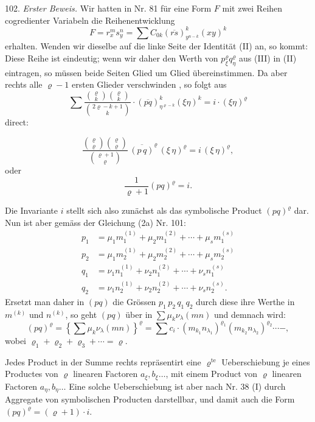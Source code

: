 102. \textit{Erster Beweis.} Wir hatten in Nr. 81 für eine Form $F$ mit
zwei Reihen cogredienter Variabeln die Reihenentwicklung
\[
F = r_x^m s_y^n = \sum C_{0k}(\overline{rs})^k_{y^{n-k}}(xy)^k
\]
erhalten. Wenden wir dieselbe auf die linke Seite der Identität (II)
an, so kommt:
Diese Reihe ist eindeutig; wenn wir daher den Werth von $p^\varrho_\xi q^\varrho_\eta$
aus (III) in (II) eintragen, so müssen beide Seiten Glied um Glied
übereinstimmen. Da aber rechts alle $\varrho-1$ ersten Glieder verschwinden
, so folgt aus
\[
\sum \frac{\binom{\varrho}{k}\binom{\varrho}{k}}{\binom{2\varrho-k+1}{k}}\cdot(\overline{pq})^k_{\eta^{\varrho-k}}(\xi\eta)^k = i\cdot(\xi\eta)^\varrho
\]
direct:


\[
\frac{\binom{\varrho}{\varrho}\binom{\varrho}{\varrho}}{\binom{\varrho+1}{\varrho}}\,\overline{(p\,q)}^\varrho\,(\xi\,\eta)^\varrho = i\,(\xi\,\eta)^\varrho,
\]
oder
\[
\frac{1}{\varrho+1}(pq)^\varrho = i.
\]

Die Invariante $i$ stellt sich also zunächst als das symbolische Product $(pq)^\varrho$ dar. Nun ist aber gemäss der Gleichung (2a) Nr. 101:
\[
\begin{aligned}
p_1 &= \mu_1 m_1^{(1)} + \mu_2 m_1^{(2)} + \cdots + \mu_s m_1^{(s)}\\
p_2 &= \mu_1 m_2^{(1)} + \mu_2 m_2^{(2)} + \cdots + \mu_s m_2^{(s)}\\
q_1 &= \nu_1 n_1^{(1)} + \nu_2 n_1^{(2)} + \cdots + \nu_s n_1^{(s)}\\
q_2 &= \nu_1 n_2^{(1)} + \nu_2 n_2^{(2)} + \cdots + \nu_s n_2^{(s)}.
\end{aligned}
\]
Ersetzt man daher in $(pq)$ die Grössen $p_1\,p_2\,q_1\,q_2$ durch diese ihre Werthe in $m^{(k)}$ und $n^{(k)}$, so geht $(pq)$ über in $\sum \mu_k \nu_\lambda (mn)$ und demnach wird:
\[
(pq)^\varrho = \left\{\sum \mu_k \nu_\lambda (mn)\right\}^\varrho = \sum c_i \cdot (m_{k_1} n_{\lambda_1})^{\varrho_1} (m_{k_2} n_{\lambda_2})^{\varrho_2} \cdots -, %
\]
wobei $\varrho_1 + \varrho_2 + \varrho_3 + \cdots = \varrho$.

Jedes Product in der Summe rechts repräsentirt eine $\varrho^{\text{te}}$ Ueberschiebung je eines Productes von $\varrho$ linearen Factoren $a_\xi, b_\xi \ldots$, mit einem Product von $\varrho$ linearen Factoren $a_\eta, b_\eta\ldots$ Eine solche Ueberschiebung ist aber nach Nr. 38 (I) durch Aggregate von symbolischen Producten darstellbar, und damit auch die Form $(pq)^\varrho = (\varrho + 1) \cdot i$.

